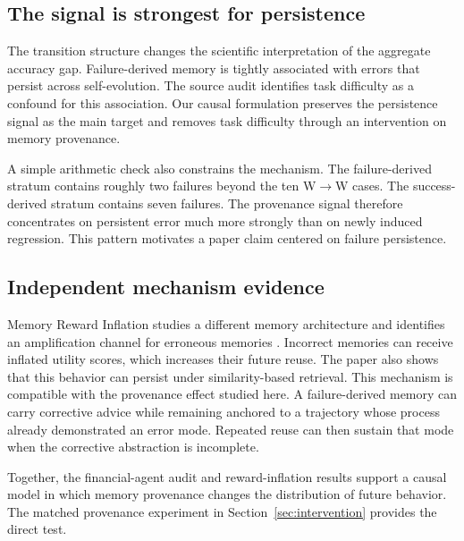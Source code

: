 \subsection{The signal is strongest for persistence}
The transition structure changes the scientific interpretation of the aggregate accuracy gap. Failure-derived memory is tightly associated with errors that persist across self-evolution. The source audit identifies task difficulty as a confound for this association. Our causal formulation preserves the persistence signal as the main target and removes task difficulty through an intervention on memory provenance.

A simple arithmetic check also constrains the mechanism. The failure-derived stratum contains roughly two failures beyond the ten W$\rightarrow$W cases. The success-derived stratum contains seven failures. The provenance signal therefore concentrates on persistent error much more strongly than on newly induced regression. This pattern motivates a paper claim centered on failure persistence.

\subsection{Independent mechanism evidence}
Memory Reward Inflation studies a different memory architecture and identifies an amplification channel for erroneous memories \citep{asadolahi2026inflation}. Incorrect memories can receive inflated utility scores, which increases their future reuse. The paper also shows that this behavior can persist under similarity-based retrieval. This mechanism is compatible with the provenance effect studied here. A failure-derived memory can carry corrective advice while remaining anchored to a trajectory whose process already demonstrated an error mode. Repeated reuse can then sustain that mode when the corrective abstraction is incomplete.

Together, the financial-agent audit and reward-inflation results support a causal model in which memory provenance changes the distribution of future behavior. The matched provenance experiment in Section~\ref{sec:intervention} provides the direct test.
